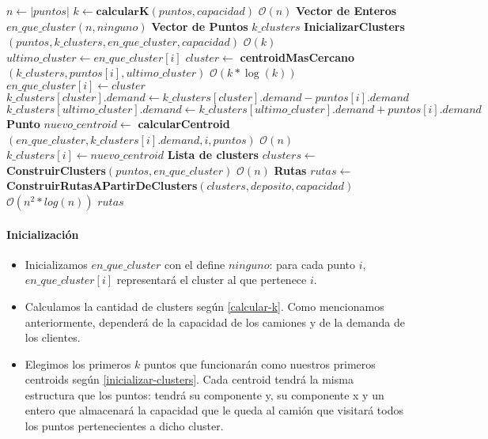 \begin{algorithm}[H]
	\caption{\Comment $\mathcal{O}(cant\_it * n*k*\log(k)+n ^2*log(n)) = \mathcal{O}(n^2*log(n))$}
	\begin{algorithmic}[1]
		\State $n \gets |puntos|$
		\State $k \gets \textbf{calcularK}(puntos, capacidad)$ \Comment $\mathcal{O}(n)$
		\Statex
		\State \textbf{Vector de Enteros} $en\_que\_cluster\mathcal{}(n, ninguno)$
		\State \textbf{Vector de Puntos} $k\_clusters$
		\State \textbf{InicializarClusters}$(puntos, k\_clusters, en\_que\_cluster, capacidad)$  \Comment $\mathcal{O}(k)$
		\Statex
		\State $ultimo\_cluster \gets en\_que\_cluster[i]$
		\State $cluster \gets $ \textbf{centroidMasCercano}$(k\_clusters, puntos[i], ultimo\_cluster)$ \Comment $\mathcal{O}(k*\log(k))$
		\State $en\_que\_cluster[i] \gets cluster$
		\State $k\_clusters[cluster].demand \gets k\_clusters[cluster].demand-puntos[i].demand$
		\State $k\_clusters[ultimo\_cluster].demand \gets k\_clusters[ultimo\_cluster].demand + puntos[i].demand$
		\EndIf
		\EndIf
		\EndFor
		\State \textbf{Punto } $nuevo\_centroid \gets $ \textbf{calcularCentroid}$(en\_que\_cluster, k\_clusters[i].demand, i, puntos)$ \Comment $\mathcal{O}(n)$
		\State $k\_clusters[i] \gets nuevo\_centroid$
		\EndIf
		\EndFor
		\EndWhile
		\Statex
		\State \textbf{Lista de clusters} $clusters \gets $ \textbf{ConstruirClusters}$(puntos, en\_que\_cluster)$ \Comment $\mathcal{O}(n)$
		\State \textbf{Rutas} $rutas \gets$ \textbf{ConstruirRutasAPartirDeClusters}$(clusters, deposito, capacidad)$ \Comment $\mathcal{O}(n^2*log(n))$
		\Statex
		\State \Return $rutas$
		\EndFunction
	\end{algorithmic}
\end{algorithm}

\paragraph{Inicialización}

\begin{itemize}
	\item Inicializamos $en\_que\_cluster$ con el define $ninguno$: para cada punto $i$, $en\_que\_cluster[i]$ representará el cluster al que pertenece $i$. 
	\item Calculamos la cantidad de clusters según \ref{calcular-k}. Como mencionamos anteriormente, dependerá de la capacidad de los camiones y de la demanda de los clientes.
	\item Elegimos los primeros $k$ puntos que funcionarán como nuestros primeros centroids según \ref{inicializar-clusters}. Cada centroid tendrá la misma estructura que los puntos: tendrá su componente y, su componente x y un entero que almacenará la capacidad que le queda al camión que visitará todos los puntos pertenecientes a dicho cluster.
\end{itemize}

